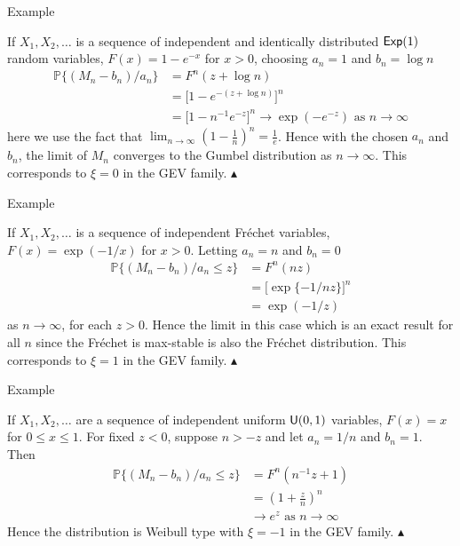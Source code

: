 \documentclass[10pt]{beamer}
\newcommand\xqed[1]{%
  \leavevmode\unskip\penalty9999 \hbox{}\nobreak\hfill
  \quad\hbox{#1}}
\newcommand\eqed{\xqed{$\blacktriangle$}}
\begin{document}
\begin{frame}{Example}
\begin{example}
If $X_1, X_2, \ldots$ is a sequence of independent and identically distributed $\text{\sffamily Exp}(1)$ random variables, $F(x) = 1-e^{-x}$ for $x>0$, choosing $a_n = 1$ and $b_n = \log n$
\begin{align*}
\mathbb{P}\{(M_n-b_n)/a_n\} &= F^n(z + \log n)\\
&= \bigg[1-e^{-(z+\log n)}\bigg]^n\\
&= \bigg[1-n^{-1}e^{-z}\bigg]^n \to \exp(-e^{-z}) \text{ as } n \to \infty
\end{align*}
here we use the fact that $\lim_{n \to \infty} \left(1-\frac{1}{n}\right)^n = \frac{1}{e}$. Hence with the chosen $a_n$ and $b_n$, the limit of $M_n$ converges to the Gumbel distribution as $n \to \infty$. This corresponds to $\xi = 0$ in the GEV family. \eqed
\end{example}
\end{frame}

\begin{frame}{Example}
\begin{example}
If $X_1, X_2, \ldots$ is a sequence of independent Fr\'echet variables, $F(x) = \exp(-1/x)$ for $x>0$. Letting $a_n = n$ and $b_n = 0$
\begin{align*}
\mathbb{P}\{(M_n-b_n)/a_n\leq z\}  & = F^n(nz)\\
& = \Big[\exp\{-1/nz\}\Big]^n\\
& = \exp(-1/z)
\end{align*}
as $n \to \infty$, for each $z>0$. Hence the limit in this case which is an exact result for all $n$ since the Fr\'echet is max-stable is also the Fr\'echet distribution. This corresponds to $\xi = 1$ in the GEV family.
\eqed
\end{example}
\end{frame}

\begin{frame}{Example}
\begin{example}
If $X_1, X_2, \ldots$ are a sequence of independent uniform $\text{\sffamily U}(0,1)$ variables, $F(x)=x$ for $0 \leq x \leq 1$. For fixed $z < 0$, suppose $n>-z$ and let $a_n = 1/n$ and $b_n = 1$. Then
\begin{align*}
\mathbb{P}\{(M_n-b_n)/a_n\leq z\} &= F^n(n^{-1}z+1)\\
&= \left(1+\frac{z}{n}\right)^n\\
&\to e^z \text{ as } n \to \infty
\end{align*}
Hence the distribution is Weibull type with $\xi=-1$ in the GEV family.
\eqed
\end{example}
\end{frame}
\end{document}
